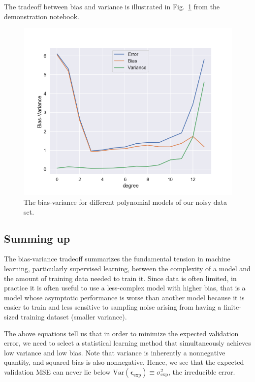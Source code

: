 \documentclass[%
oneside,                 %
final,                   %
10pt]{article}
\begin{document}
The tradeoff between bias and variance is illustrated in Fig.~\ref{fig-bias_variance} from the demonstration notebook.


\begin{figure}[!ht]  %
  \centerline{\includegraphics[width=0.8\linewidth]{fig/bias_variance.png}}
  \caption{
  The bias-variance for different polynomial models of our noisy data set. \label{fig-bias_variance}
  }
\end{figure}



\subsection{Summing up}


The bias-variance tradeoff summarizes the fundamental tension in
machine learning, particularly supervised learning, between the
complexity of a model and the amount of training data needed to train
it.  Since data is often limited, in practice it is often useful to
use a less-complex model with higher bias, that is  a model whose asymptotic
performance is worse than another model because it is easier to
train and less sensitive to sampling noise arising from having a
finite-sized training dataset (smaller variance). 



The above equations tell us that in
order to minimize the expected validation error, we need to select a
statistical learning method that simultaneously achieves low variance
and low bias. Note that variance is inherently a nonnegative quantity,
and squared bias is also nonnegative. Hence, we see that the expected
validation MSE can never lie below $\mathrm{Var}(\bm{\epsilon}_\mathrm{exp}) \equiv \sigma^2_\mathrm{exp}$, the irreducible error.
\end{document}
